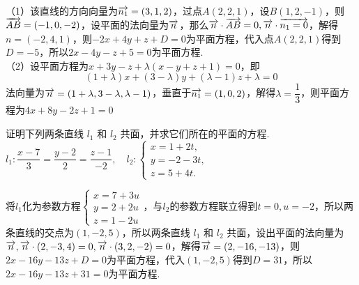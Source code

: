 \begin{solution}
    （1）该直线的方向向量为$\overrightarrow{n_1}=(3,1,2)$，过点$A(2,2,1)$，设$B(1,2,-1)$，则$\overrightarrow{AB}=(-1,0,-2)$，设平面的法向量为$\overrightarrow{n}$，那么$\overrightarrow{n}\cdot\overrightarrow{AB}=0,\overrightarrow{n}\cdot\overrightarrow{{n_1}=0}$，解得$n=(-2,4,1)$，则$-2x+4y+z+D=0$为平面方程，代入点$A(2,2,1)$得到$D=-5$，所以$2x-4y-z+5=0$为平面方程.\\
    （2）设平面方程为$x+3y-z+\lambda(x-y+z+1)=0$，即\[(1+\lambda)x+(3-\lambda)y+(\lambda-1)z+\lambda=0\]法向量为$\overrightarrow{n}=(1+\lambda,3-\lambda,\lambda-1)$，垂直于$\overrightarrow{n_1}=(1,0,2)$，解得$\lambda=\dfrac13$，则平面方程为$4x+8y-2z+1=0$
\end{solution}
\begin{example}{28}{}
    证明下列两条直线 $l_{1}$ 和 $l_{2}$ 共面，并求它们所在的平面的方程.\\
$l_{1}:\dfrac{x-7}{3}=\dfrac{y-2}{2}=\dfrac{z-1}{-2}, \quad l_{2}:\begin{cases} x=1+2t, \\ y=-2-3t, \\ z=5+4t. \end{cases}$
\end{example}
\begin{solution}
    将$l_1$化为参数方程$\begin{cases}x=7+3u\\y=2+2u\\z=1-2u\end{cases}$，与$l_2$的参数方程联立得到$t=0,u=-2$，所以两条直线的交点为$(1,-2,5)$，所以两条直线 $l_{1}$ 和 $l_{2}$ 共面，设出平面的法向量为$\overrightarrow{n},\overrightarrow{n}\cdot(2,-3,4)=0,\overrightarrow{n}\cdot(3,2,-2)=0$，解得$\overrightarrow{n}=(2,-16,-13)$，则$2x-16y-13z+D=0$为平面方程，代入$(1,-2,5)$得到$D=31$，所以$2x-16y-13z+31=0$为平面方程.
\end{solution}